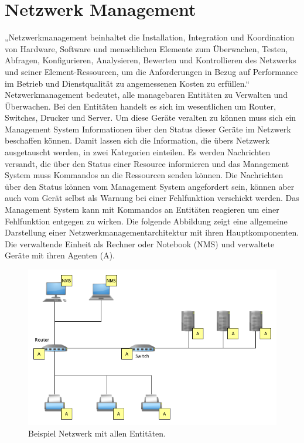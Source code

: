 \documentclass[11pt,a4paper]{article}
\begin{document}
\section*{Netzwerk Management}
„Netzwerkmanagement beinhaltet die Installation, Integration und Koordination von Hardware, Software und menschlichen Elemente zum Überwachen, Testen, Abfragen, Konfigurieren, Analysieren, Bewerten und Kontrollieren des Netzwerks und seiner Element-Ressourcen, um die Anforderungen in Bezug auf Performance im Betrieb und Dienstqualität zu angemessenen Kosten zu erfüllen.“
\cite{netmanagement}
\linebreak
Netzwerkmanagement bedeutet, alle managebaren Entitäten zu Verwalten und Überwachen. Bei den Entitäten handelt es sich im wesentlichen um Router, Switches, Drucker und Server. Um diese Geräte veralten zu können muss sich ein Management System Informationen über den Status dieser Geräte im Netzwerk beschaffen können. Damit lassen sich die Information, die übers Netzwerk ausgetauscht werden, in zwei Kategorien einteilen. Es werden Nachrichten versandt, die über den Status einer Resource informieren und das Management System muss Kommandos an die Ressourcen senden können. Die Nachrichten über den Status können vom Management System angefordert sein, können aber auch vom Gerät selbst als Warnung bei einer Fehlfunktion verschickt werden. Das Management System kann mit Kommandos an Entitäten reagieren um einer Fehlfunktion entgegen zu wirken.
Die folgende Abbildung zeigt eine allgemeine Darstellung einer Netzwerkmanagementarchitektur mit ihren Hauptkomponenten. Die verwaltende Einheit als Rechner oder Notebook (NMS) und verwaltete Geräte mit ihren Agenten (A).
\linebreak
\begin{figure}[h]
	\centering
	\includegraphics[scale=.5]{Bilder/Netzwerk.png}
	\caption{Beispiel Netzwerk mit allen Entitäten.}
\end{figure}
\linebreak
\end{document}
